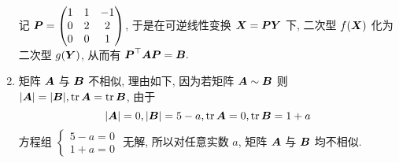 \begin{solution}
\begin{enumerate}[label=(\arabic{*})]
        记 $\vb*{P}=\begin{pmatrix} 1 & 1 & -1 \\ 0 & 2 & 2 \\ 0 & 0 & 1 \\\end{pmatrix}$, 于是在可逆线性变换 $\vb*{X}=\vb*{PY}$ 下, 二次型 $f(\vb*{X})$ 化为二次型 $g(\vb*{Y})$, 从而有 $\vb*{P}^\top\vb*{AP}=\vb*{B}.$
        \item 矩阵 $\vb*{A}$ 与 $\vb*{B}$ 不相似, 理由如下, 因为若矩阵 $\vb*{A} \sim \vb*{B}$ 则 $|\vb*{A}|=|\vb*{B}|,\tr\vb*{A}=\tr\vb*{B}$, 由于 
        $$
        |\vb*{A}|=0,|\vb*{B}|=5-a,\tr\vb*{A}=0,\tr\vb*{B}=1+a
        $$
        方程组 $\begin{cases}
            5-a=0\\ 1+a=0
        \end{cases}$ 无解, 所以对任意实数 $a$, 矩阵 $\vb*{A}$ 与 $\vb*{B}$ 均不相似.
    \end{enumerate}
\end{solution}